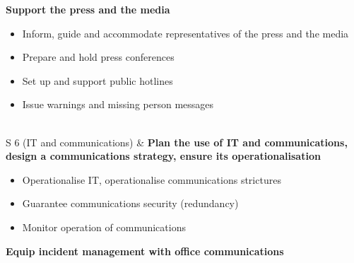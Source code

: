 \documentclass{article}
\begin{document}
\begin{tabu}
\textbf{Support the press and the media}

\begin{itemize}
\item Inform, guide and accommodate representatives of the press and the media


\item Prepare and hold press conferences


\item Set up and support public hotlines


\item Issue warnings and missing person messages


\end{itemize} \\


S 6 (IT and communications) & \textbf{Plan the use of IT and communications, design a communications strategy, ensure its operationalisation}

\begin{itemize}
\item Operationalise IT, operationalise communications strictures


\item Guarantee communications security (redundancy)


\item Monitor operation of communications


\end{itemize}

\textbf{Equip incident management with office communications}
 \\
\hline

\end{tabu}
\end{document}
